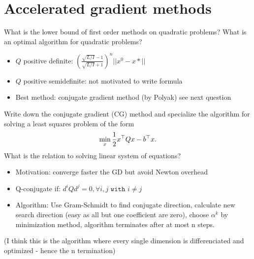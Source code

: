 \documentclass{article}
\begin{document}
\section{Accelerated gradient methods}

\begin{question}
  What is the lower bound of first order methods on quadratic problems?  What is an optimal
  algorithm for quadratic problems?
\end{question}
\begin{itemize}
\item $Q$ positive definite: $\left(\frac{\sqrt{L/I}-1}{\sqrt{L/I} + 1}\right)^n || x^0  - x* ||$
\item $Q$ positive semidefinite: not motivated to write formula
\item Best method: conjugate gradient method (by Polyak) see next question
\end{itemize}

\begin{question}
  Write down the conjugate gradient (CG) method and specialize the algorithm for solving a least
  squares problem of the form
  \[
    \min_x \frac{1}{2} x^{\top} Q x - b^{\top} x.
  \]
  What is the relation to solving linear system of equations?
\end{question}
\begin{itemize}
\item Motivation: converge faster the GD but avoid Newton overhead
\item Q-conjugate if: $d^i  Q d^j = 0, \forall i, j \texttt{ with } i \neq j$
\item Algorithm: Use Gram-Schmidt to find conjugate direction, calculate new search direction (easy
  as all but one coefficient are zero), choose $\alpha^k$ by minimization method, algorithm
  terminates after at most n steps.
\end{itemize}
(I think this is the algorithm where every single dimension is differenciated and optimized - hence
the n termination)
\end{document}
